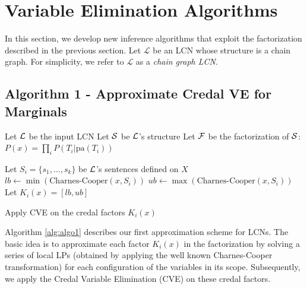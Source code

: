 \documentclass{article}
\begin{document}
\section{Variable Elimination Algorithms}
\label{sec-ve}

In this section, we develop new inference algorithms that exploit the factorization described in the previous section. Let $\mathcal{L}$ be an LCN whose structure is a chain graph. For simplicity, we refer to $\mathcal{L}$ as a \emph{chain graph LCN}.  

\subsection{Algorithm 1 - Approximate Credal VE for Marginals}

\begin{algorithm}[t]
  \caption{Approx-CVE for LCNs}
  \label{alg:algo1}
    \begin{algorithmic}[1]

    \State Let $\mathcal{L}$ be the input LCN
    \State Let $\mathcal{S}$ be $\mathcal{L}$'s structure
    \State Let $\mathcal{F}$ be the factorization of $\mathcal{S}$: $P(x) = \prod_i P(T_i | \mbox{pa}(T_i))$
    
            \State Let $S_i = \{s_1, ..., s_k\}$ be $\mathcal{L}$'s sentences defined on $X$
            \State $lb \leftarrow \min (\mbox{Charnes-Cooper}(x, S_i))$
            \State $ub \leftarrow \max (\mbox{Charnes-Cooper}(x, S_i))$
            \State Let $K_i(x) = [lb, ub]$
        \EndFor
    \EndFor

    \State Apply CVE on the credal factors $K_i(x)$
    \end{algorithmic}
\end{algorithm}

Algorithm \ref{alg:algo1} describes our first approximation scheme for LCNs. The basic idea is to approximate each factor $K_i(x)$ in the factorization by solving a series of local LPs (obtained by applying the well known Charnes-Cooper transformation) for each configuration of the variables in its scope. Subsequently, we apply the Credal Variable Elimination (CVE) on these credal factors.
\end{document}
